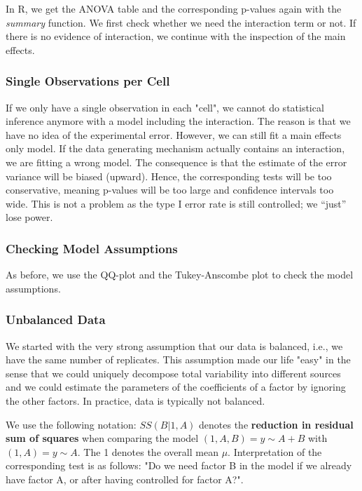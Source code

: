 In R, we get the ANOVA table and the corresponding p-values again with the \textit{summary} function. We first check whether we need the interaction term or not. If there is no evidence of interaction, we continue with the inspection of the main effects.

\subsubsection{Single Observations per Cell}

If we only have a single observation in each "cell", we cannot do statistical inference anymore with a model including the interaction. The reason is that we have no idea of the experimental error. However, we can still fit a main effects only model. If the data generating mechanism actually contains an interaction, we are fitting a wrong model. The consequence is that the estimate of the error variance will be biased (upward). Hence, the corresponding tests will be too conservative, meaning p-values will be too large and confidence intervals too wide. This is not a problem as the type I error rate is still controlled; we “just” lose power.

\subsubsection{Checking Model Assumptions}

As before, we use the QQ-plot and the Tukey-Anscombe plot to check the model assumptions.

\subsubsection{Unbalanced Data}

We started with the very strong assumption that our data is balanced, i.e., we have the same number of replicates. This assumption made our life "easy" in the sense that we could uniquely decompose total variability into different sources and we could estimate the parameters of the coefficients of a factor by ignoring the other factors. In practice, data is typically not balanced. \medskip

We use the following notation: $SS( B | 1, A)$ denotes the \textbf{reduction in residual sum of squares} when comparing the model $(1, A, B) = y \sim A + B$ with $(1, A) = y \sim A$. The 1 denotes the overall mean $\mu$. Interpretation of the corresponding test is as follows: "Do we need factor B in the model if we already have factor A, or after having controlled for factor A?". \medskip

